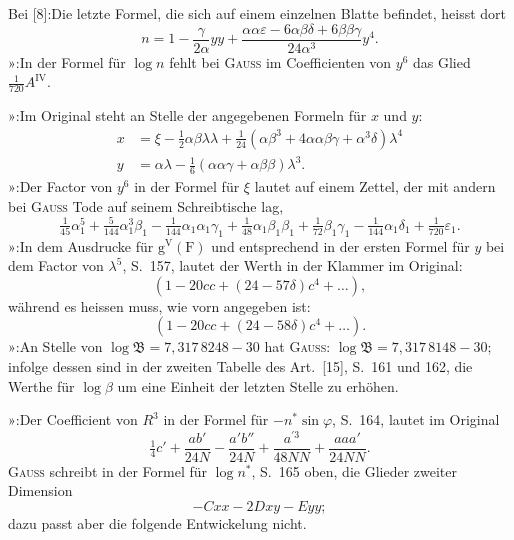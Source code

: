 {\small
\noindent Bei [8]:\quad Die letzte Formel, die sich auf einem einzelnen Blatte befindet, heisst dort
\[
n=1-\frac{\gamma}{2\alpha}yy+
\frac{\alpha\alpha\varepsilon-6\alpha\beta\delta+6\beta\beta\gamma}{24\alpha^3}y^4.
\]
\noindent »\quad [9]:\quad In der Formel für \(\log n\) fehlt bei \textsc{Gauss} im Coefficienten von \(y^6\) das Glied \(\tfrac1{720}A^{\mathrm{IV}}\).

\noindent »\quad [11]:\quad Im Original steht an Stelle der angegebenen Formeln für \(x\) und \(y\):
\[
\begin{aligned}
x&=\xi-\tfrac12\alpha\beta\lambda\lambda
+\tfrac1{24}(\alpha\beta^3+4\alpha\alpha\beta\gamma+\alpha^3\delta)\lambda^4\\
y&=\alpha\lambda-\tfrac16(\alpha\alpha\gamma+\alpha\beta\beta)\lambda^3.
\end{aligned}
\]
\noindent »\quad [12]:\quad Der Factor von \(y^6\) in der Formel für \(\xi\) lautet auf einem Zettel, der mit andern bei \textsc{Gauss} Tode auf seinem Schreibtische lag,
\[
\tfrac1{45}\alpha_1^5+\tfrac5{144}\alpha_1^3\beta_1
-\tfrac1{144}\alpha_1\alpha_1\gamma_1+\tfrac1{48}\alpha_1\beta_1\beta_1
+\tfrac1{72}\beta_1\gamma_1-\tfrac1{144}\alpha_1\delta_1+\tfrac1{720}\varepsilon_1.
\]
\noindent »\quad [13]:\quad In dem Ausdrucke für \(\mathrm g^{\mathrm V}(\mathrm F)\)
und entsprechend in der ersten Formel für \(y\) bei dem Factor von \(\lambda^5\),
S.\ 157, lautet der Werth in der Klammer im Original:
\[
(1-20cc+(24-57\delta)c^4+\ldots),
\]
\noindent während es heissen muss, wie vorn angegeben ist:
\[
(1-20cc+(24-58\delta)c^4+\ldots).
\]
\noindent »\quad [15]:\quad An Stelle von \(\log\mathfrak{B}=7{,}317\,8248-30\) hat
\textsc{Gauss}: \(\log\mathfrak{B}=7{,}317\,8148-30\); infolge dessen sind in der
zweiten Tabelle des Art.\ [15], S.\ 161 und 162, die Werthe für \(\log\beta\) um
eine Einheit der letzten Stelle zu erhöhen.

\noindent »\quad [16]:\quad Der Coefficient von \(R^3\) in der Formel für \(-n^*\sin\varphi\),
S.\ 164, lautet im Original
\[
\tfrac14c'+\frac{ab'}{24N}-\frac{a'b''}{24N}
+\frac{a^{\prime3}}{48NN}+\frac{aaa'}{24NN}.
\]
\noindent \textsc{Gauss} schreibt in der Formel für \(\log n^*\), S.\ 165 oben,
die Glieder zweiter Dimension
\[
-Cxx-2Dxy-Eyy;
\]
\noindent dazu passt aber die folgende Entwickelung nicht.

}
